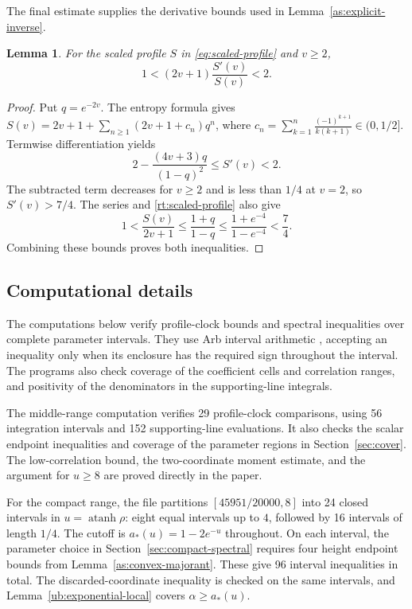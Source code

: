 \documentclass[11pt,letterpaper]{amsart}
\newcommand{\1}{\mathbf 1}
\DeclareMathOperator{\atanh}{atanh}
\newtheorem{lemma}[theorem]{Lemma}
\numberwithin{equation}{section}
\begin{document}
The final estimate supplies the derivative bounds used in
Lemma~\ref{as:explicit-inverse}.

\begin{lemma}\label{app:scaled-profile-derivative}
For the scaled profile $S$ in \eqref{eq:scaled-profile} and $v\ge2$,
\[
 1<(2v+1)\frac{S'(v)}{S(v)}<2.
\]
\end{lemma}

\begin{proof}
Put $q=e^{-2v}$.
The entropy formula gives
$S(v)=2v+1+\sum_{n\ge1}(2v+1+c_n)q^n$,
where $c_n=\sum_{k=1}^n\frac{(-1)^{k+1}}{k(k+1)}\in(0,1/2]$.
Termwise differentiation yields
\[
 2-\frac{(4v+3)q}{(1-q)^2}\le S'(v)<2.
\]
The subtracted term decreases for $v\ge2$ and is less than $1/4$
at $v=2$, so $S'(v)>7/4$.
The series and \eqref{rt:scaled-profile} also give
\[
 1<\frac{S(v)}{2v+1}
 \le\frac{1+q}{1-q}
 \le\frac{1+e^{-4}}{1-e^{-4}}<\frac74.
\]
Combining these bounds proves both inequalities.
\end{proof}

\subsection{Computational details}

The computations below verify profile-clock bounds and spectral
inequalities over complete parameter intervals. They use Arb interval arithmetic
\cite{Johansson2017}, accepting an inequality only when its
enclosure has the required sign throughout the interval.
The programs also check coverage of the coefficient cells and correlation
ranges, and positivity of the denominators in the supporting-line
integrals.

The middle-range computation verifies 29 profile-clock comparisons,
using 56 integration intervals and 152 supporting-line evaluations.
It also checks the scalar endpoint inequalities and coverage of
the parameter regions in Section~\ref{sec:cover}.
The low-correlation bound, the two-coordinate moment estimate,
and the argument for $u\ge8$ are proved directly in the paper.

For the compact range, the file
partitions $[45951/20000,8]$ into 24 closed intervals in
$u=\atanh\rho$: eight equal intervals up to $4$, followed by
16 intervals of length $1/4$.
The cutoff is $a_*(u)=1-2e^{-u}$ throughout.
On each interval, the parameter choice in
Section~\ref{sec:compact-spectral} requires four height endpoint
bounds from Lemma~\ref{as:convex-majorant}.
These give 96 interval inequalities in total.
The discarded-coordinate inequality is checked on the same
intervals, and Lemma~\ref{ub:exponential-local} covers
$\alpha\ge a_*(u)$.
\end{document}
